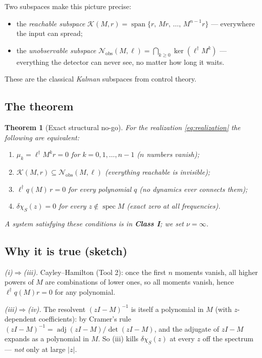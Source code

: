 \documentclass[11pt]{article}
\newtheorem{theorem}{Theorem}
\newcommand{\adj}{\operatorname{adj}}
\newcommand{\spann}{\operatorname{span}}
\newcommand{\kry}{\mathcal K}
\newcommand{\nobs}{\mathcal N_{\mathrm{obs}}}
\begin{document}
Two subspaces make this picture precise:
\begin{itemize}
\item the \emph{reachable subspace}
$\kry(M,r)=\spann\{r,\,Mr,\,\dots,\,M^{n-1}r\}$
--- everywhere the input can spread;
\item the \emph{unobservable subspace}
$\nobs(M,\ell)=\bigcap_{k\ge0}\ker(\ell^\dagger M^k)$
--- everything the detector can never see, no matter how long it waits.
\end{itemize}
These are the classical \emph{Kalman} subspaces from control theory.

\subsection{The theorem}

\begin{theorem}[Exact structural no-go]
\label{thm:one}
For the realization \eqref{eq:realization} the following are equivalent:
\begin{enumerate}
\item[(i)] $\mu_k=\ell^\dagger M^k r=0$ for $k=0,1,\dots,n-1$
\hfill (\emph{$n$ numbers vanish});
\item[(ii)] $\kry(M,r)\subseteq\nobs(M,\ell)$
\hfill (\emph{everything reachable is invisible});
\item[(iii)] $\ell^\dagger q(M)\,r=0$ for every polynomial $q$
\hfill (\emph{no dynamics ever connects them});
\item[(iv)] $\delta\chi_S(z)=0$ for every $z\notin\operatorname{spec}M$
\hfill (\emph{exact zero at all frequencies}).
\end{enumerate}
A system satisfying these conditions is in \textbf{Class I}; we set
$\nu=\infty$.
\end{theorem}

\subsection{Why it is true (sketch)}

\emph{(i)$\Rightarrow$(iii).}  Cayley--Hamilton (Tool 2): once the first $n$
moments vanish, all higher powers of $M$ are combinations of lower ones, so
all moments vanish, hence $\ell^\dagger q(M)r=0$ for any polynomial.

\emph{(iii)$\Rightarrow$(iv).}  The resolvent $(zI-M)^{-1}$ is itself a
polynomial in $M$ (with $z$-dependent coefficients): by Cramer's rule
$(zI-M)^{-1}=\adj(zI-M)/\det(zI-M)$, and the adjugate of $zI-M$ expands as a
polynomial in $M$.  So (iii) kills $\delta\chi_S(z)$ at every $z$ off the
spectrum --- \emph{not} only at large $|z|$.
\end{document}
